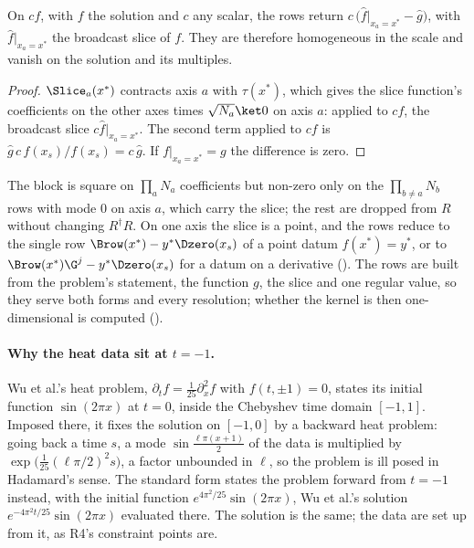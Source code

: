 \begin{proposition}
\label{prop:datum-slice}
On $cf$, with $f$ the solution and $c$ any scalar, the rows return $c\,\bigl(\hat f|_{x_a=x^*}-\hat g\bigr)$, with $\hat f|_{x_a=x^*}$ the broadcast slice of $f$. They are therefore homogeneous in the scale and vanish on the solution and its multiples.
\end{proposition}
\begin{proof}
$\Slice_a(x^*)$ contracts axis $a$ with $\tau(x^*)$, which gives the slice function's coefficients on the other axes times $\sqrt{N_a}\ket0$ on axis $a$: applied to $cf$, the broadcast slice $c\hat f|_{x_a=x^*}$. The second term applied to $cf$ is $\hat g\,c\,f(x_s)/f(x_s)=c\,\hat g$. If $f|_{x_a=x^*}=g$ the difference is zero.
\end{proof}

The block is square on $\prod_aN_a$ coefficients but non-zero only on the $\prod_{b\ne a}N_b$ rows with mode $0$ on axis $a$, which carry the slice; the rest are dropped from $R$ without changing $R^\dagger R$. On one axis the slice is a point, and the rows reduce to the single row $\Brow(x^*)-y^*\Dzero(x_s)$ of a point datum $f(x^*)=y^*$, or to $\Brow(x^*)\G^j-y^*\Dzero(x_s)$ for a datum on a derivative (). The rows are built from the problem's statement, the function $g$, the slice and one regular value, so they serve both forms and every resolution; whether the kernel is then one-dimensional is computed ().

\paragraph{Why the heat data sit at $t=-1$.} Wu et al.'s heat problem, $\partial_tf=\tfrac1{25}\partial_x^2f$ with $f(t,\pm1)=0$, states its initial function $\sin(2\pi x)$ at $t=0$, inside the Chebyshev time domain $[-1,1]$. Imposed there, it fixes the solution on $[-1,0]$ by a backward heat problem: going back a time $s$, a mode $\sin\tfrac{\ell\pi(x+1)}{2}$ of the data is multiplied by $\exp\bigl(\tfrac{1}{25}(\ell\pi/2)^2s\bigr)$, a factor unbounded in $\ell$, so the problem is ill posed in Hadamard's sense. The standard form states the problem forward from $t=-1$ instead, with the initial function $e^{4\pi^2/25}\sin(2\pi x)$, Wu et al.'s solution $e^{-4\pi^2t/25}\sin(2\pi x)$ evaluated there. The solution is the same; the data are set up from it, as R4's constraint points are.

